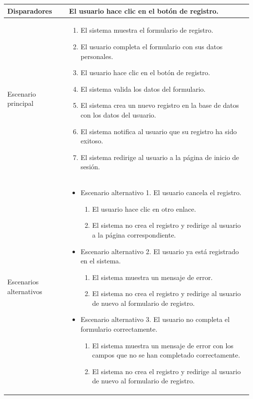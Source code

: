 \begin{table}[H]
\begin{tabular}{
  >{\columncolor{lightgreen!20}}p{4cm}
  p{10cm}
}
\midrule
Disparadores & El usuario hace clic en el botón de registro. \\
\midrule
Escenario principal & \begin{enumerate}
    \item El sistema muestra el formulario de registro.
    \item El usuario completa el formulario con sus datos personales.
    \item El usuario hace clic en el botón de registro.
    \item El sistema valida los datos del formulario.
    \item El sistema crea un nuevo registro en la base de datos con los datos del usuario.
    \item El sistema notifica al usuario que su registro ha sido exitoso.
    \item El sistema redirige al usuario a la página de inicio de sesión.
\end{enumerate} \\
\midrule
Escenarios alternativos & 
\begin{itemize}
    \item Escenario alternativo 1. El usuario cancela el registro.
    \begin{enumerate}
        \item El usuario hace clic en otro enlace.
        \item El sistema no crea el registro y redirige al usuario a la página correspondiente.
    \end{enumerate}
    \item Escenario alternativo 2. El usuario ya está registrado en el sistema.
    \begin{enumerate}
        \item El sistema muestra un mensaje de error.
        \item El sistema no crea el registro y redirige al usuario de nuevo al formulario de registro.
    \end{enumerate}
    \item Escenario alternativo 3. El usuario no completa el formulario correctamente.
    \begin{enumerate}
        \item El sistema muestra un mensaje de error con los campos que no se han completado correctamente.
        \item El sistema no crea el registro y redirige al usuario de nuevo al formulario de registro.
    \end{enumerate}

\end{itemize}
\end{tabular}
\end{table}
